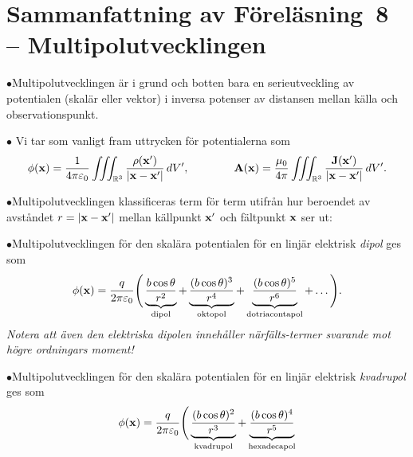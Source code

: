 {{{{{\section{Sammanfattning av F{\"o}rel{\"a}sning~8 -- Multipolutvecklingen}
\item{$\bullet$}{Multipolutvecklingen {\"a}r i grund och botten bara en
  serieutveckling av potentialen (skal{\"a}r eller vektor) i inversa
  potenser av distansen mellan k{\"a}lla och observationspunkt.}
\item{$\bullet$}{
  Vi tar som vanligt fram uttrycken f{\"o}r potentialerna som
  $$
    \phi({\bf x})={{1}\over{4\pi\varepsilon_0}}
      \iiint_{{\Bbb R}^3}{{\rho({\bf x}')}\over{|{\bf x}-{\bf x}'|}}\,dV',
      \qquad\qquad
    {\bf A}({\bf x})={{\mu_0}\over{4\pi}}
      \iiint_{{\Bbb R}^3}{{{\bf J}({\bf x}')}\over{|{\bf x}-{\bf x}'|}}\,dV'.
  $$}
\item{$\bullet$}{Multipolutvecklingen klassificeras term f{\"o}r term
  utifr{\aa}n hur beroendet av avst{\aa}ndet $r=|{\bf x}-{\bf x}'|$ mellan
  k{\"a}llpunkt ${\bf x}'$ och f{\"a}ltpunkt ${\bf x}$ ser ut:
  }
\item{$\bullet$}{Multipolutvecklingen f{\"o}r den skal{\"a}ra potentialen
  f{\"o}r en linj{\"a}r elektrisk {\it dipol} ges som
  $$
    \phi({\bf x})
       ={{q}\over{2\pi\varepsilon_0}}\Bigg(
         \underbrace{{{b\cos\theta}\over{r^2}}}_{\rm dipol}
         +\underbrace{{{(b\cos\theta)^3}\over{r^4}}}_{\rm oktopol}
         +\underbrace{{{(b\cos\theta)^5}\over{r^6}}}_{\rm dotriacontapol}
         +\ldots
        \Bigg).
  $$
  {\it Notera att {\"a}ven den elektriska dipolen inneh{\aa}ller
  n{\"a}rf{\"a}lts-termer svarande mot h{\"o}gre ordningars moment!}}
\item{$\bullet$}{Multipolutvecklingen f{\"o}r den skal{\"a}ra potentialen
  f{\"o}r en linj{\"a}r elektrisk {\it kvadrupol} ges som
  $$
    \phi({\bf x})
      ={{q}\over{2\pi\varepsilon_0}}\Bigg(
         \underbrace{{{(b\cos\theta)^2}\over{r^3}}}_{\rm kvadrupol}
         +\underbrace{{{(b\cos\theta)^4}\over{r^5}}}_{\rm hexadecapol}
$$}}}}}}
